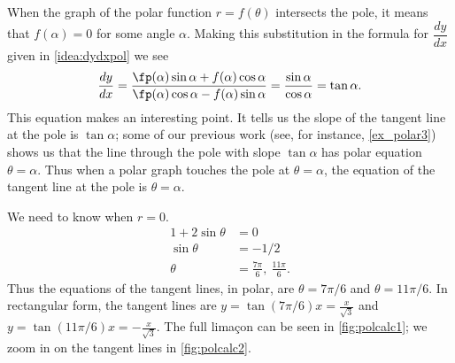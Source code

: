 When the graph of the polar function $r=f(\theta)$ intersects the pole, it means that $f(\alpha) = 0$ for some angle $\alpha$. Making this substitution in the formula for $\dfrac{dy}{dx}$ given in \autoref{idea:dydxpol} we see
\[
 \frac{dy}{dx}
 =\frac{\fp(\alpha)\sin\alpha+f(\alpha)\cos\alpha}{\fp(\alpha)\cos\alpha-f(\alpha)\sin\alpha}
 =\frac{\sin\alpha}{\cos\alpha}
 =\tan\alpha.
\]
%
This equation makes an interesting point. It tells us the slope of the tangent line at the pole is $\tan \alpha$; some of our previous work (see, for instance, \autoref{ex_polar3}) shows us that the line through the pole with slope $\tan \alpha$ has polar equation $\theta=\alpha$. Thus when a polar graph touches the pole at $\theta=\alpha$, the equation of the tangent line at the pole is $\theta=\alpha$.

{We need to know when $r=0$. 
\begin{align*}
1+2\sin\theta &= 0\\
\sin\theta &= -1/2\\
\theta &= \frac{7\pi}{6},\ \frac{11\pi}6.
\end{align*}
Thus the equations of the tangent lines, in polar, are $\theta = 7\pi/6$ and $\theta = 11\pi/6$. In rectangular form, the tangent lines are $y=\tan(7\pi/6)x=\frac x{\sqrt3}$ and $y=\tan(11\pi/6)x=-\frac x{\sqrt3}$. The full lima\c con can be seen in \autoref{fig:polcalc1}; we zoom in on the tangent lines in \autoref{fig:polcalc2}.}

